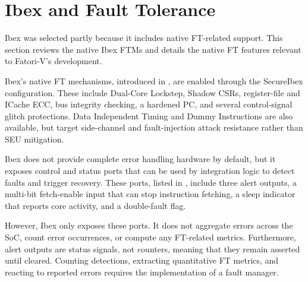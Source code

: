 \section{Ibex and Fault Tolerance}
\label{chap5:ibex_ft}

Ibex was selected partly because it includes native \ac{FT}-related support. This section reviews the native Ibex \acp{FTM} and details the native \ac{FT} features relevant to \ac{Fatori-V}'s development.

Ibex's native \ac{FT} mechanisms, introduced in , are enabled through the SecureIbex configuration. These include Dual-Core Lockstep, Shadow \acp{CSR}, register-file and ICache \ac{ECC}, bus integrity checking, a hardened \ac{PC}, and several control-signal glitch protections. Data Independent Timing and Dummy Instructions are also available, but target side-channel and fault-injection attack resistance rather than \ac{SEU} mitigation.

Ibex does not provide complete error handling hardware by default, but it exposes control and status ports that can be used by integration logic to detect faults and trigger recovery. These ports, listed in , include three alert outputs, a multi-bit fetch-enable input that can stop instruction fetching, a sleep indicator that reports core activity, and a double-fault flag.

However, Ibex only exposes these ports. It does not aggregate errors across the \ac{SoC}, count error occurrences, or compute any \ac{FT}-related metrics. Furthermore, alert outputs are status signals, not counters, meaning that they remain asserted until cleared. Counting detections, extracting quantitative \ac{FT} metrics, and reacting to reported errors requires the implementation of a fault manager.

